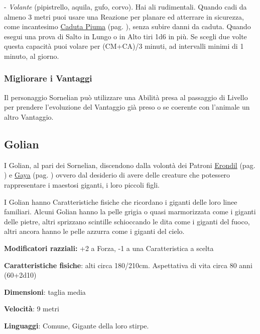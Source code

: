 \begin{multicols}{2}
- \emph{Volante} (pipistrello, aquila, gufo, corvo). Hai ali rudimentali. Quando cadi da almeno 3 metri puoi usare una Reazione per planare ed atterrare in sicurezza, come incantesimo \hyperlink{cadutapiuma}{Caduta Piuma} (pag. \pageref{cadutapiuma}), senza subire danni da caduta. Quando esegui una prova di Salto in Lungo o in Alto tiri 1d6 in più. Se scegli due volte questa capacità puoi volare per (CM+CA)/3 minuti, ad intervalli minimi di 1 minuto, al giorno.

\subsubsection{Migliorare i Vantaggi}

Il personaggio Sornelian può utilizzare una Abilità presa al passaggio di Livello per prendere l'evoluzione del Vantaggio già preso o se coerente con l'animale un altro Vantaggio.

\subsection{Golian}\label{golian}\hypertarget{golian}{}

I Golian, al pari dei Sornelian, discendono dalla volontà dei Patroni \hyperlink{erondil}{Erondil} (pag. \pageref{erondil}) e \hyperlink{gaya}{Gaya} (pag. \pageref{gaya}) ovvero dal desiderio di avere delle creature che potessero rappresentare i maestosi giganti, i loro piccoli figli.

I Golian hanno Caratteristiche fisiche che ricordano i giganti delle loro linee familiari. Alcuni Golian hanno la pelle grigia o quasi marmorizzata come i giganti delle pietre, altri sprizzano scintille schioccando le dita come i giganti del fuoco, altri ancora hanno le pelle azzurra come i giganti del cielo.

\textbf{Modificatori razziali:} +2 a Forza, -1 a una Caratteristica a scelta

\textbf{Caratteristiche fisiche}: alti circa 180/210cm. Aspettativa di vita circa 80 anni (60+2d10)

\textbf{Dimensioni}: taglia media

\textbf{Velocità}: 9 metri

\textbf{Linguaggi}: Comune, Gigante della loro stirpe.


\end{multicols}
